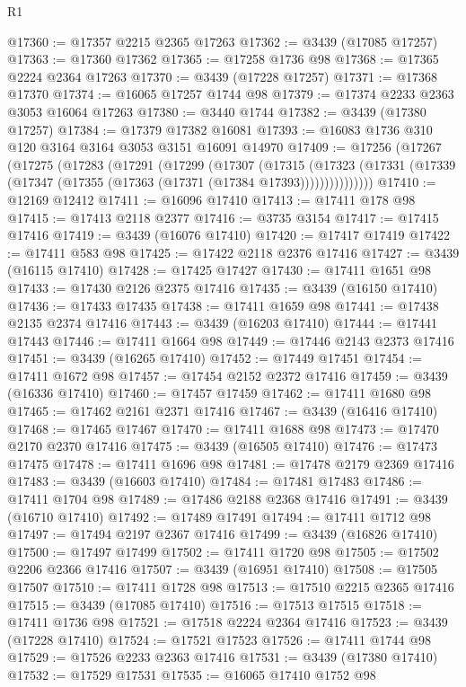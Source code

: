 \begin{lexlean}{R1}
\begin{coremodule}
@17360 := @17357 @2215 @2365 @17263
@17362 := @3439 (@17085 @17257)
@17363 := @17360 @17362
@17365 := @17258 @1736 @98
@17368 := @17365 @2224 @2364 @17263
@17370 := @3439 (@17228 @17257)
@17371 := @17368 @17370
@17374 := @16065 @17257 @1744 @98
@17379 := @17374 @2233 @2363 @3053 @16064 @17263
@17380 := @3440 @1744
@17382 := @3439 (@17380 @17257)
@17384 := @17379 @17382 @16081
@17393 := @16083 @1736 @310 @120 @3164 @3164 @3053 @3151 @16091 @14970
@17409 := @17256
    (@17267
      (@17275
        (@17283
          (@17291
            (@17299
              (@17307
                (@17315
                  (@17323
                    (@17331 (@17339 (@17347 (@17355 (@17363 (@17371 (@17384 @17393)))))))))))))))
@17410 := @12169 @12412
@17411 := @16096 @17410
@17413 := @17411 @178 @98
@17415 := @17413 @2118 @2377
@17416 := @3735 @3154
@17417 := @17415 @17416
@17419 := @3439 (@16076 @17410)
@17420 := @17417 @17419
@17422 := @17411 @583 @98
@17425 := @17422 @2118 @2376 @17416
@17427 := @3439 (@16115 @17410)
@17428 := @17425 @17427
@17430 := @17411 @1651 @98
@17433 := @17430 @2126 @2375 @17416
@17435 := @3439 (@16150 @17410)
@17436 := @17433 @17435
@17438 := @17411 @1659 @98
@17441 := @17438 @2135 @2374 @17416
@17443 := @3439 (@16203 @17410)
@17444 := @17441 @17443
@17446 := @17411 @1664 @98
@17449 := @17446 @2143 @2373 @17416
@17451 := @3439 (@16265 @17410)
@17452 := @17449 @17451
@17454 := @17411 @1672 @98
@17457 := @17454 @2152 @2372 @17416
@17459 := @3439 (@16336 @17410)
@17460 := @17457 @17459
@17462 := @17411 @1680 @98
@17465 := @17462 @2161 @2371 @17416
@17467 := @3439 (@16416 @17410)
@17468 := @17465 @17467
@17470 := @17411 @1688 @98
@17473 := @17470 @2170 @2370 @17416
@17475 := @3439 (@16505 @17410)
@17476 := @17473 @17475
@17478 := @17411 @1696 @98
@17481 := @17478 @2179 @2369 @17416
@17483 := @3439 (@16603 @17410)
@17484 := @17481 @17483
@17486 := @17411 @1704 @98
@17489 := @17486 @2188 @2368 @17416
@17491 := @3439 (@16710 @17410)
@17492 := @17489 @17491
@17494 := @17411 @1712 @98
@17497 := @17494 @2197 @2367 @17416
@17499 := @3439 (@16826 @17410)
@17500 := @17497 @17499
@17502 := @17411 @1720 @98
@17505 := @17502 @2206 @2366 @17416
@17507 := @3439 (@16951 @17410)
@17508 := @17505 @17507
@17510 := @17411 @1728 @98
@17513 := @17510 @2215 @2365 @17416
@17515 := @3439 (@17085 @17410)
@17516 := @17513 @17515
@17518 := @17411 @1736 @98
@17521 := @17518 @2224 @2364 @17416
@17523 := @3439 (@17228 @17410)
@17524 := @17521 @17523
@17526 := @17411 @1744 @98
@17529 := @17526 @2233 @2363 @17416
@17531 := @3439 (@17380 @17410)
@17532 := @17529 @17531
@17535 := @16065 @17410 @1752 @98

\end{coremodule}
\end{lexlean}
